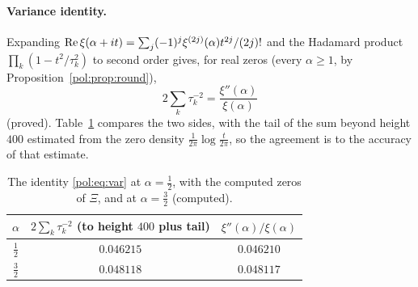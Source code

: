 \paragraph{Variance identity.} Expanding $\operatorname{Re}\xi(\alpha+it)=\sum_j(-1)^j\xi^{(2j)}(\alpha)t^{2j}/(2j)!$ and the Hadamard product $\prod_k(1-t^2/\tau_k^2)$ to second order gives, for real zeros (every $\alpha\ge1$, by Proposition~\ref{pol:prop:round}),
\begin{equation}\label{pol:eq:var}
2\sum_k\tau_k^{-2}=\frac{\xi''(\alpha)}{\xi(\alpha)}
\end{equation}
(proved). Table~\ref{pol:tab:var} compares the two sides, with the tail of the sum beyond height $400$ estimated from the zero density $\frac1{2\pi}\log\frac t{2\pi}$, so the agreement is to the accuracy of that estimate.

\begin{table}[ht]
\centering\small
\begin{tabular}{ccc}
\toprule
$\alpha$ & $2\sum_k\tau_k^{-2}$ (to height $400$ plus tail) & $\xi''(\alpha)/\xi(\alpha)$\\
\midrule
$\frac12$ & $0.046215$ & $0.046210$\\
$\frac32$ & $0.048118$ & $0.048117$\\
\bottomrule
\end{tabular}
\caption{The identity \eqref{pol:eq:var} at $\alpha=\frac12$, with the computed zeros of $\Xi$, and at $\alpha=\frac32$ (computed).}\label{pol:tab:var}
\end{table}

